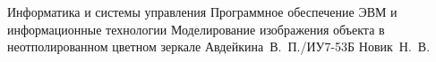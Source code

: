 \makecourseworktitle
{Информатика и системы управления} %
{Программное обеспечение ЭВМ и информационные технологии} %
{Моделирование изображения объекта в неотполированном цветном зеркале} %
{Авдейкина~В.~П./ИУ7-53Б} %
{Новик~Н.~В.} %
{} %
